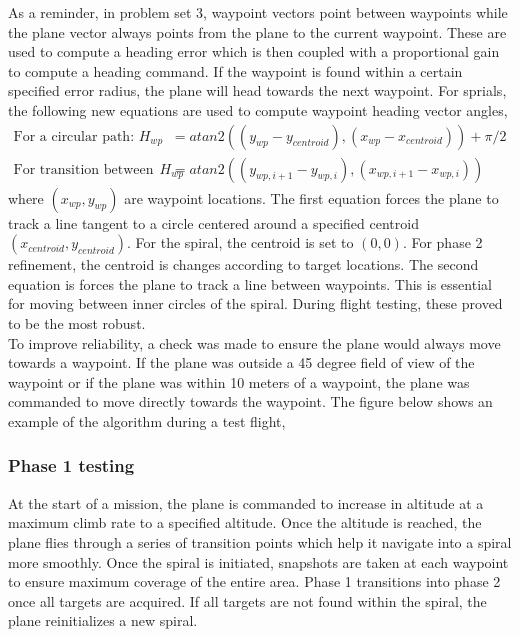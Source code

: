 \documentclass[11pt]{article}
\begin{document}
As a reminder, in problem set 3, waypoint vectors point between waypoints while the plane vector always points from the plane to the current waypoint. These are used to compute a heading error which is then coupled with a proportional gain to compute a heading command. If the waypoint is found within a certain specified error radius, the plane will head towards the next waypoint. For sprials, the following new equations are used to compute waypoint heading vector angles,
\begin{align*}
\mbox{For a circular path: } H_{wp} &= atan2((y_{wp}-y_{centroid}),(x_{wp}-x_{centroid})) + \pi /2 \\
\mbox{For transition between spirals: } H_{wp} &= atan2((y_{wp,i+1}-y_{wp,i}),(x_{wp,i+1}-x_{wp,i}))
\end{align*}
where $(x_{wp},y_{wp})$ are waypoint locations. The first equation forces the plane to track a line tangent to a circle centered around a specified centroid $(x_{centroid},y_{centroid})$. For the spiral, the centroid is set to $(0,0)$. For phase 2 refinement, the centroid is changes according to target locations. The second equation is forces the plane to track a line between waypoints. This is essential for moving between inner circles of the spiral. During flight testing, these proved to be the most robust.\\

To improve reliability, a check was made to ensure the plane would always move towards a waypoint. If the plane was outside a 45 degree field of view of the waypoint or if the plane was within 10 meters of a waypoint, the plane was commanded to move directly towards the waypoint. The figure below shows an example of the algorithm during a test flight,

\subsubsection{Phase 1 testing}
At the start of a mission, the plane is commanded to increase in altitude at a maximum climb rate to a specified altitude. Once the altitude is reached, the plane flies through a series of transition points which help it navigate into a spiral more smoothly. Once the spiral is initiated, snapshots are taken at each waypoint to ensure maximum coverage of the entire area. Phase 1 transitions into phase 2 once all targets are acquired. If all targets are not found within the spiral, the plane reinitializes a new spiral.\\
\end{document}
